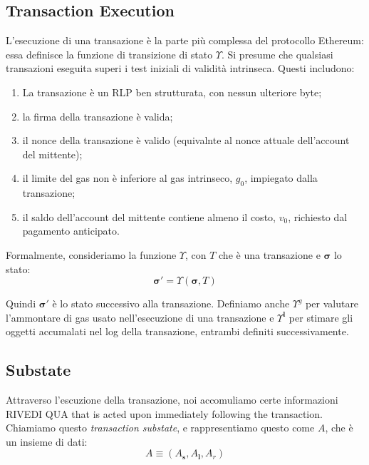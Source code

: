 \documentclass[9pt,oneside]{amsart}
\begin{document}
\begin{multicols}{2}

\section{Transaction Execution} \label{ch:transactions}

L'esecuzione di una transazione è la parte più complessa del protocollo Ethereum: essa definisce la funzione di transizione di stato $\Upsilon$. Si presume che qualsiasi transazioni eseguita superi i test iniziali di validità intrinseca. Questi includono:

\begin{enumerate}
\item La transazione è un RLP ben strutturata, con nessun ulteriore byte;
\item la firma della transazione è valida;
\item il nonce della transazione è valido (equivalnte al nonce attuale dell'account del mittente);
\item il limite del gas non è inferiore al gas intrinseco, $g_0$, impiegato dalla transazione;
\item il saldo dell'account del mittente contiene almeno il costo, $v_0$, richiesto dal pagamento anticipato.
\end{enumerate}

Formalmente, consideriamo la funzione $\Upsilon$, con $T$ che è una transazione e $\boldsymbol{\sigma}$ lo stato:
\begin{equation}
\boldsymbol{\sigma}' = \Upsilon(\boldsymbol{\sigma}, T)
\end{equation}

Quindi $\boldsymbol{\sigma}'$ è lo stato successivo alla transazione. Definiamo anche $\Upsilon^g$ per valutare l'ammontare di gas usato nell'esecuzione di una transazione e $\Upsilon^\mathbf{l}$ per stimare gli oggetti accumalati nel log della transazione, entrambi definiti successivamente.

\subsection{Substate}
Attraverso l'escuzione della transazione, noi accomuliamo certe informazioni RIVEDI QUA that is acted upon immediately following the transaction. Chiamiamo questo \textit{transaction substate}, e rappresentiamo questo come $A$, che è un insieme di dati:
\begin{equation}
A \equiv (A_\mathbf{s}, A_\mathbf{l}, A_r)
\end{equation}


\end{multicols}
\end{document}
